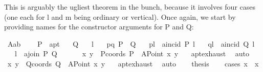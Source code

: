 \begin{isabellebody}
\begin{isamarkuptext}
This is arguably the ugliest theorem in the bunch, because it involves four cases (one each for 
l and m being ordinary or vertical). Once again, we start by providing names for the constructor
arguments for P and Q:
 \seiji%
\end{isamarkuptext}\isamarkuptrue%
\isamarkupfalse%
\ A{}{\isacharunderscore}{\kern0pt}a{}b{\isacharcolon}{\kern0pt}\ \isanewline
\ \ \ P\ {\isacharcolon}{\kern0pt}{\isacharcolon}{\kern0pt}\ a{}pt\isanewline
\ \ \ Q\isanewline
\ \ \ l\isanewline
\ \ \ pq{\isacharcolon}{\kern0pt}\ {\isachardoublequoteopen}P\ {\isasymnoteq}\ Q{\isachardoublequoteclose}\isanewline
\ \ \ pl\ {\isacharcolon}{\kern0pt}\ {\isachardoublequoteopen}a{}incid\ P\ l{\isachardoublequoteclose}\isanewline
\ \ \ ql\ {\isacharcolon}{\kern0pt}\ {\isachardoublequoteopen}a{}incid\ Q\ l{\isachardoublequoteclose}\isanewline
\ \ \ {\isachardoublequoteopen}l\ {\isacharequal}{\kern0pt}\ a{}join\ P\ Q{\isachardoublequoteclose}\isanewline
%
\isadelimproof
\isanewline
%
\endisadelimproof
%
\isatagproof
{}\isamarkupfalse%
\ {\isacharminus}{\kern0pt}\ \isanewline
\ \ \isamarkupfalse%
\ x{}\ y{}\ \ Pcoords{\isacharcolon}{\kern0pt}\ {\isachardoublequoteopen}P\ {\isacharequal}{\kern0pt}\ {\isacharparenleft}{\kern0pt}A{}Point\ x{}\ y{}{\isacharparenright}{\kern0pt}{\isachardoublequoteclose}\ \ \isamarkupfalse%
\ a{}pt{\isachardot}{\kern0pt}exhaust\ \isamarkupfalse%
\ auto\isanewline
\ \ \isamarkupfalse%
\ x{}\ y{}\ \ Qcoords{\isacharcolon}{\kern0pt}\ {\isachardoublequoteopen}Q\ {\isacharequal}{\kern0pt}\ {\isacharparenleft}{\kern0pt}A{}Point\ x{}\ y{}{\isacharparenright}{\kern0pt}{\isachardoublequoteclose}\ \ \isamarkupfalse%
\ a{}pt{\isachardot}{\kern0pt}exhaust\ \isamarkupfalse%
\ auto\isanewline
\ \ \isamarkupfalse%
\ {\isacharquery}{\kern0pt}thesis\isanewline
\ \ \isamarkupfalse%
\ {\isacharparenleft}{\kern0pt}cases\ {\isachardoublequoteopen}{\isacharparenleft}{\kern0pt}x{}\ {\isacharequal}{\kern0pt}\ x{}{\isacharparenright}{\kern0pt}{\isachardoublequoteclose}{\isacharparenright}{\kern0pt}\isanewline

\end{isabellebody}
